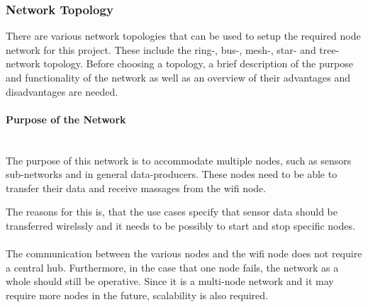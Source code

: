 \subsubsection{Network Topology}

There are various network topologies that can be used to setup the required node network for this project.
These include the ring-, bus-, mesh-, star- and tree-network topology. 
Before choosing a topology, a brief description of the purpose and functionality of the network as well as an overview of their advantages and disadvantages are needed. 

\paragraph{Purpose of the Network}~\\
The purpose of this network is to accommodate multiple nodes, such as sensors sub-networks and in general data-producers.
These nodes need to be able to transfer their data and receive massages from the wifi node.

The reasons for this is, that the use cases specify that sensor data should be transferred wirelssly and it needs to be possibly to start and stop specific nodes.
\\\\
The communication between the various nodes and the wifi node does not require a central hub.
Furthermore, in the case that one node fails, the network as a whole should still be operative.
Since it is a multi-node network and it may require more nodes in the future, scalability is also required.

